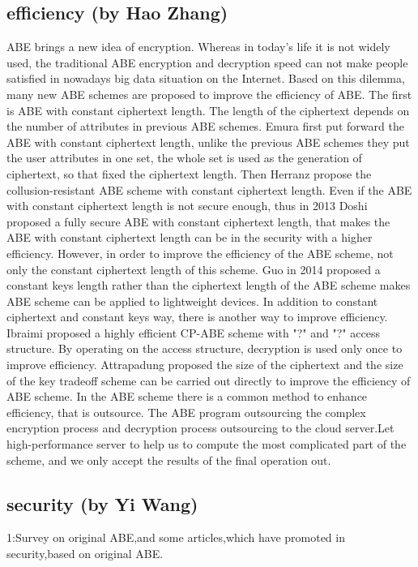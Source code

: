 \subsection{efficiency (by Hao Zhang)}
ABE brings a new idea of encryption. Whereas in today's life it is not widely used, the traditional ABE encryption and decryption speed can not make people satisfied in nowadays big data situation on the Internet. Based on this dilemma, many new ABE schemes are proposed to improve the efficiency of ABE. The first is ABE with constant ciphertext length. The length of the ciphertext depends on the number of attributes in previous ABE schemes. Emura \cite{Keita:ISPEC'09} first put forward the ABE with constant ciphertext length, unlike the previous ABE schemes they put the user attributes in one set, the whole set is used as the generation of ciphertext, so that fixed the ciphertext length. Then Herranz \cite{Javier:PKC'10} propose the collusion-resistant ABE scheme with constant ciphertext length. Even if the ABE with constant ciphertext length is not secure enough, thus in 2013 Doshi \cite{Nishant:Wiley'14} proposed a fully secure ABE with constant ciphertext length, that makes the ABE with constant ciphertext length can be in the security with a higher efficiency.
	However, in order to improve the efficiency of the ABE scheme, not only the constant ciphertext length of this scheme. Guo \cite{Fuchun:TIFS'14} in 2014 proposed a constant keys length rather than the ciphertext length of the ABE scheme makes ABE scheme can be applied to lightweight devices. In addition to constant ciphertext and constant keys way, there is another way to improve efficiency. Ibraimi \cite{Luan:ISPEC'09} proposed a highly efficient CP-ABE scheme with "?" and "?" access structure. By operating on the access structure, decryption is used only once to improve efficiency. Attrapadung \cite{Nuttapong:ACNS'16} proposed the size of the ciphertext and the size of the key tradeoff scheme can be carried out directly to improve the efficiency of ABE scheme.
	In the ABE scheme there is a common method to enhance efficiency, that is outsource. The ABE program outsourcing the complex encryption process and decryption process outsourcing to the cloud server.Let high-performance server to help us to compute the most complicated part of the scheme, and we only accept the results of the final operation out.

\subsection{security (by Yi Wang)}
1:Survey on original ABE,and some articles,which have promoted in security,based on original ABE.


